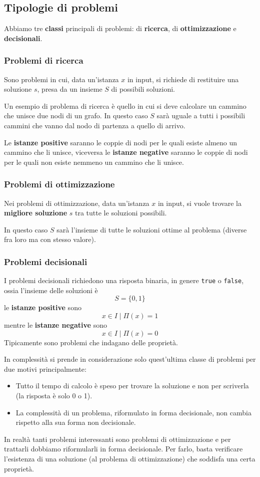 \subsection{Tipologie di problemi}
Abbiamo tre \textbf{classi} principali di problemi: di \textbf{ricerca}, di \textbf{ottimizzazione} e
\textbf{decisionali}.

\subsubsection{Problemi di ricerca}
Sono problemi in cui, data un'istanza $x$ in input, si richiede di restituire una soluzione $s$, presa da un insieme
$S$ di possibili soluzioni.

Un esempio di problema di ricerca \`e quello in cui si deve calcolare un cammino che unisce due nodi di un grafo. In
questo caso $S$ sar\`a uguale a tutti i possibili cammini che vanno dal nodo di partenza a quello di arrivo.

Le \textbf{istanze positive} saranno le coppie di nodi per le quali esiste almeno un cammino che li unisce, viceversa
le \textbf{istanze negative} saranno le coppie di nodi per le quali non esiste nemmeno un cammino che li unisce.

\subsubsection{Problemi di ottimizzazione}
Nei problemi di ottimizzazione, data un'istanza $x$ in input, si vuole trovare la \textbf{migliore soluzione} $s$ tra
tutte le soluzioni possibili.

In questo caso $S$ sar\`a l'insieme di tutte le soluzioni ottime al problema (diverse fra loro ma con stesso valore).

\subsubsection{Problemi decisionali}
I problemi decisionali richiedono una risposta binaria, in genere \verb|true| o \verb|false|, ossia l'insieme delle
soluzioni \`e
\[ S = \{ 0, 1 \} \]
le \textbf{istanze positive} sono
\[ x \in I \mid \Pi(x) = 1 \]
mentre le \textbf{istanze negative} sono
\[ x \in I \mid \Pi(x) = 0 \]
Tipicamente sono problemi che indagano delle propriet\`a.

In complessit\`a si prende in considerazione solo quest'ultima classe di problemi per due motivi principalmente:
\begin{itemize}
	\item Tutto il tempo di calcolo \`e speso per trovare la soluzione e non per scriverla (la risposta \`e solo 0 o 1).
	\item La complessit\`a di un problema, riformulato in forma decisionale, non cambia rispetto alla sua forma non
	      decisionale.
\end{itemize}
In realt\`a tanti problemi interessanti sono problemi di ottimizzazione e per trattarli dobbiamo riformularli in
forma decisionale. Per farlo, basta verificare l'esistenza di una soluzione (al problema di ottimizzazione) che
soddisfa una certa propriet\`a.

